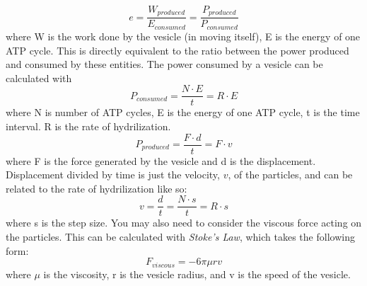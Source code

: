 \begin{equation}
e = \frac{W_{produced}}{E_{consumed}} = \frac{P_{produced}}{P_{consumed}}
\end{equation}
where W is the work done by the vesicle (in moving itself), E is the energy of one ATP cycle.
This is directly equivalent to the ratio between the power produced and consumed by these entities.
The power consumed by a vesicle can be calculated with
\begin{equation}
P_{consumed} = \frac{N \cdot E}{t} = R \cdot E
\end{equation}
where N is number of ATP cycles, E is the energy of one ATP cycle, t is the time interval. R is the rate of hydrilization.
\begin{equation}
P_{produced} = \frac{F \cdot d}{t} = F \cdot v
\end{equation}
where F is the force generated by the vesicle and d is the displacement.
Displacement divided by time is just the velocity, $v$, of the particles, and can be related to the rate of hydrilization like so:
\begin{equation}
v = \frac{d}{t} = \frac{N \cdot s}{t} = R \cdot s
\end{equation}
where s is the step size.
You may also need to consider the viscous force acting on the particles. This can be calculated with \emph{Stoke's Law}, which takes the following form:
\begin{equation}
F_{viscous} = -6 \pi \mu r v
\end{equation}
where $\mu$ is the viscosity, r is the vesicle radius, and v is the speed of the vesicle.


